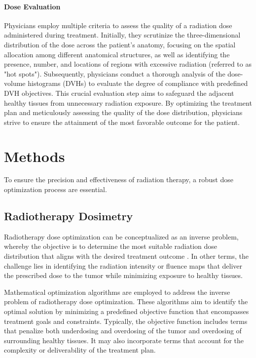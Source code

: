 \documentclass[a4paper]{article}
\begin{document}
	\paragraph{Dose Evaluation}
	Physicians employ multiple criteria to assess the quality of a radiation dose administered during treatment.
	Initially, they scrutinize the three-dimensional distribution of the dose across the patient's anatomy, focusing on the spatial allocation among different anatomical structures, as well as identifying the presence, number, and locations of regions with excessive radiation (referred to as "hot spots").
	Subsequently, physicians conduct a thorough analysis of the dose-volume histograms (DVHs) to evaluate the degree of compliance with predefined DVH objectives. This crucial evaluation step aims to safeguard the adjacent healthy tissues from unnecessary radiation exposure.
	By optimizing the treatment plan and meticulously assessing the quality of the dose distribution, physicians strive to ensure the attainment of the most favorable outcome for the patient.
	
	
	
	\section{Methods}
	To ensure the precision and effectiveness of radiation therapy, a robust dose optimization process are essential.
	
	\subsection{Radiotherapy Dosimetry}
	Radiotherapy dose optimization can be conceptualized as an inverse problem, whereby the objective is to determine the most suitable radiation dose distribution that aligns with the desired treatment outcome \cite{Webb2003}.
	In other terms, the challenge lies in identifying the radiation intensity or fluence maps that deliver the prescribed dose to the tumor while minimizing exposure to healthy tissues.
	
	Mathematical optimization algorithms are employed to address the inverse problem of radiotherapy dose optimization.
	These algorithms aim to identify the optimal solution by minimizing a predefined objective function that encompasses treatment goals and constraints.
	Typically, the objective function includes terms that penalize both underdosing and overdosing of the tumor and overdosing of surrounding healthy tissues.
	It may also incorporate terms that account for the complexity or deliverability of the treatment plan.
	
\end{document}

